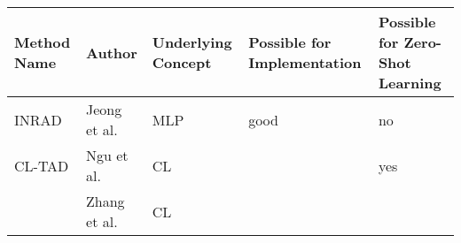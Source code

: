 \begin{longtable}[]{@{}lllll@{}}
\toprule\noalign{}
Method Name & Author & Underlying Concept & Possible for Implementation
& Possible for Zero-Shot Learning \\
\midrule\noalign{}
\endhead
\bottomrule\noalign{}
\endlastfoot
INRAD & Jeong et al. & MLP & good & no \\
CL-TAD & Ngu et al. & CL & & yes \\
& Zhang et al. & CL & & \\
\end{longtable}
